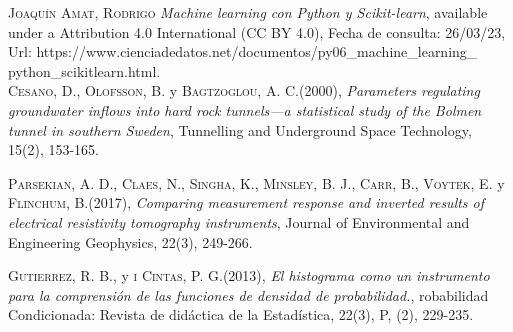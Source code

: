 \documentclass[sn-mathphys,Numbered]{sn-jnl}%
\theoremstyle{thmstyleone}%
\theoremstyle{thmstyletwo}%
\theoremstyle{thmstylethree}%
\begin{document}
	\begin{thebibliography}{X}\label{sec7}
	
	 \textsc{Joaquín Amat, Rodrigo}
	\textit{Machine learning con Python y Scikit-learn}, available under a Attribution 4.0 International (CC BY 4.0), Fecha de consulta: 26/03/23,\\
	Url: https://www.cienciadedatos.net/documentos/py06\_machine\_learning\_\\
	python\_scikitlearn.html.\\
	
	 \textsc{Cesano, D., Olofsson, B.} y \textsc{Bagtzoglou, A. C.}(2000),
	\textit{Parameters regulating groundwater inflows into hard rock tunnels—a statistical study of the Bolmen tunnel in southern Sweden}, Tunnelling and Underground Space Technology, 15(2), 153-165.
	
	 \textsc{Parsekian, A. D., Claes, N., Singha, K., Minsley, B. J., Carr, B., Voytek, E.} y \textsc{Flinchum, B.}(2017),
	\textit{Comparing measurement response and inverted results of electrical resistivity tomography instruments}, Journal of Environmental and Engineering Geophysics, 22(3), 249-266.
	
	
	 \textsc{Gutierrez, R. B.,} y \textsc{i Cintas, P. G.}(2013),
	\textit{El histograma como un instrumento para la comprensión de las funciones de densidad de probabilidad.}, robabilidad Condicionada: Revista de didáctica de la Estadística, 22(3), P, (2), 229-235.
	
	 
	
	
	\end{thebibliography}
\end{document}
